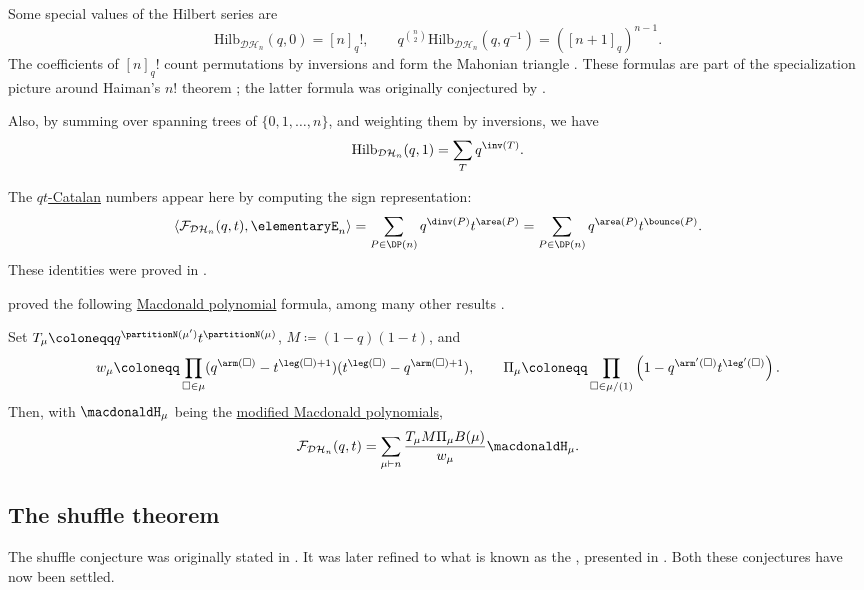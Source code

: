 Some special values of the Hilbert series are
\[
\mathrm{Hilb}_{\mathcal{DH}_n}(q,0) = [n]_q!, \qquad
q^{\binom{n}{2}}\mathrm{Hilb}_{\mathcal{DH}_n}(q,q^{-1})
= ([n+1]_q)^{n-1}.
\]
The coefficients of $[n]_q!$ count permutations by inversions and form the
Mahonian triangle .
These formulas are part of the specialization picture around Haiman's
$n!$ theorem \cite{Haiman1994,Haiman2002}; the latter formula was originally
conjectured by .

Also, by summing over spanning trees of $\{0,1,\dotsc,n\}$,
and weighting them by inversions, we have
\[
\mathrm{Hilb}_{\mathcal{DH}_n}(q,1) = \sum_{T} q^{\inv(T)}.
\]

The \hyperref[qtCatalan]{$qt$-Catalan} numbers appear here by computing the
sign representation:
\[
\left\langle \mathcal{F}_{\mathcal{DH}_n}(q,t), \elementaryE_{n} \right\rangle =
\sum_{ P \in \DP(n) } q^{\dinv(P)} t^{\area(P)} =
\sum_{ P \in \DP(n) } q^{\area(P)} t^{\bounce(P)}.
\]
These identities were proved in \cite[Thm.~I.2]{GarsiaHaglund2000}.



 proved the following
\hyperref[macdonaldPolynomialDefinition]{Macdonald polynomial} formula,
among many other results \cite[Thm.~3.10]{Haiman2002}.
\begin{theorem}[Haiman (2002)]
Set $T_\mu \coloneqq q^{\partitionN(\mu')}t^{\partitionN(\mu)}$,
$M\coloneqq(1-q)(1-t)$, and
\[
w_\mu \coloneqq \prod_{\square \in \mu}
(q^{\arm(\square)} - t^{\leg(\square)+1})
(t^{\leg(\square)}- q^{\arm(\square)+1} ),
\qquad
\Pi_\mu \coloneqq \prod_{\square \in \mu/(1)} \left(1- q^{\arm'(\square)} t^{\leg'(\square)} \right).
\]
Then, with $\macdonaldH_\mu$ being the \hyperref[macdonaldH]{modified Macdonald polynomials},
\[
\mathcal{F}_{\mathcal{DH}_n}(q,t)
= \sum_{\mu \vdash n}
  \frac{ T_\mu M \Pi_\mu B(\mu)}{ w_\mu } \macdonaldH_\mu .
\]
\end{theorem}





\subsection[dhShuffleTheorem]{The shuffle theorem}

The shuffle conjecture was originally stated in \cite{HaglundHaimanLoehrRemmelUlyanov2005}.
It was later refined to what is known as the
\label{compositionalShuffleConjecture}, presented in
\cite{HaglundMorseZabrocki2012}.
Both these conjectures have now been settled.


